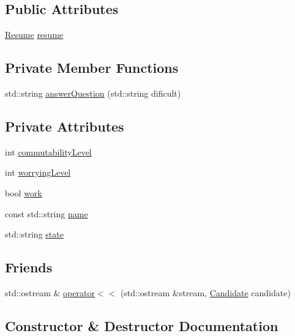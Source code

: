 \subsection*{Public Attributes}
\begin{DoxyCompactItemize}
\item 
\hyperlink{class_resume}{Resume} \hyperlink{class_candidate_aa377897c9a9bdf566f7f1074f37d9ff1}{resume}
\end{DoxyCompactItemize}
\subsection*{Private Member Functions}
\begin{DoxyCompactItemize}
\item 
std\+::string \hyperlink{class_candidate_aa0d4d9afae45b7ce3a3808af2bfba228}{answer\+Question} (std\+::string dificult)
\end{DoxyCompactItemize}
\subsection*{Private Attributes}
\begin{DoxyCompactItemize}
\item 
int \hyperlink{class_candidate_a143f4a4644276e9a1914e12c4be8b986}{commutability\+Level}
\item 
int \hyperlink{class_candidate_a5c05cc634ba4472a0897d2e669f37963}{worrying\+Level}
\item 
bool \hyperlink{class_candidate_ab0a3583b677b47424e2da3f267a8036a}{work}
\item 
const std\+::string \hyperlink{class_candidate_ab3c913ca21b7c5239b48e551483bb808}{name}
\item 
std\+::string \hyperlink{class_candidate_a521dc0a66f6b111e5c70d64f6ecfbca5}{state}
\end{DoxyCompactItemize}
\subsection*{Friends}
\begin{DoxyCompactItemize}
\item 
std\+::ostream \& \hyperlink{class_candidate_ae89bdf092b73462b5a958aae6dbd35f0}{operator$<$$<$} (std\+::ostream \&stream, \hyperlink{class_candidate}{Candidate} candidate)
\end{DoxyCompactItemize}


\subsection{Constructor \& Destructor Documentation}
\hypertarget{class_candidate_aa2747741fb662af5e8f3d01d1d1a43b6}{}\label{class_candidate_aa2747741fb662af5e8f3d01d1d1a43b6} 
